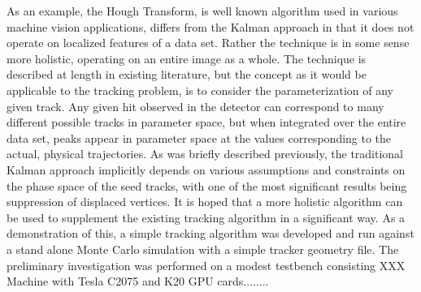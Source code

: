 \documentclass{JINST}
\begin{document}
As an example, the Hough Transform, is well known algorithm used in various machine
vision applications, differs from the Kalman approach in that it does not operate on
localized features of a data set.  Rather the technique is in some sense more
holistic, operating on an entire image as a whole.
The technique is described at length in existing literature, but the concept as it would be applicable to the
tracking problem, is to consider the parameterization of any given track.  Any given hit
observed in the detector can correspond to many different possible tracks in parameter
space, but when integrated over the entire data set, peaks appear in parameter space
at the values corresponding to the actual, physical trajectories.  As was briefly described
previously, the traditional Kalman approach implicitly depends on various assumptions and
constraints on the phase space of the seed tracks, with one of the most significant
results being suppression of displaced vertices.  It is hoped that a more holistic algorithm
can be used to supplement the existing tracking algorithm in a significant way.
As a demonstration of this, a simple tracking algorithm was developed 
and run against a stand alone Monte Carlo simulation with a simple tracker geometry file. 
The preliminary investigation was performed on a modest testbench consisting XXX Machine
with Tesla C2075 and K20 GPU cards........

\end{document}
